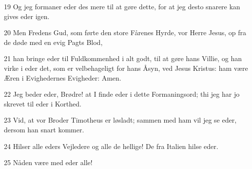 \par 19 Og jeg formaner eder des mere til at gøre dette, for at jeg desto snarere kan gives eder igen.
\par 20 Men Fredens Gud, som førte den store Fårenes Hyrde, vor Herre Jesus, op fra de døde med en evig Pagts Blod,
\par 21 han bringe eder til Fuldkommenhed i alt godt, til at gøre hans Villie, og han virke i eder det, som er velbehageligt for hans Åsyn, ved Jesus Kristus: ham være Æren i Evighedernes Evigheder: Amen.
\par 22 Jeg beder eder, Brødre! at I finde eder i dette Formaningsord; thi jeg har jo skrevet til eder i Korthed.
\par 23 Vid, at vor Broder Timotheus er løsladt; sammen med ham vil jeg se eder, dersom han snart kommer.
\par 24 Hilser alle eders Vejledere og alle de hellige! De fra Italien hilse eder.
\par 25 Nåden være med eder alle!



